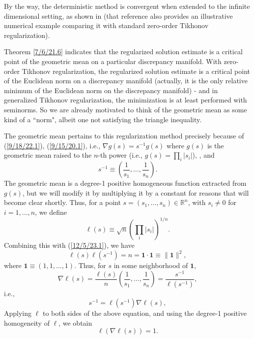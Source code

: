 \documentclass{amsart}
\numberwithin{equation}{section}
\theoremstyle{definition}
\numberwithin{theorem}{section}
\begin{document}
 By the way, the deterministic method is convergent when extended to the infinite dimensional setting, as shown in \cite{fgreensite:2022d} (that reference also provides an illustrative numerical example comparing it with standard zero-order Tikhonov regularization). 
 
 \bigskip
 
Theorem \ref{7/6/21.6} indicates that the regularized solution estimate is a critical point of the geometric mean on a particular discrepancy manifold.  With zero-order Tikhonov regularization, the regularized solution estimate is a critical point of the Euclidean norm on a discrepancy manifold (actually, it is the only relative minimum of the Euclidean norm on the discrepancy manifold) - and in generalized Tikhonov regularization, the minimization is at least performed with seminorms.  So we are already motivated to think of the geometric mean as some kind of a ``norm", albeit one not satisfying the triangle inequality. 

The geometric mean pertains to this regularization method precisely because of (\ref{9/18/22.1}), (\ref{9/15/20.1}), i.e., $\nabla g(s) = s^{-1}g(s)$ where $g(s)$ is the geometric mean raised to the $n$-th power (i.e., $g(s) = \prod_i |s_i|$), , and \begin{equation}\label{12/5/23.1} s^{-1}\equiv\left(\frac{1}{s_1},\dots, \frac{1}{s_n}\right).\end{equation} 
The geometric mean is a degree-1 positive homogeneous function extracted from $g(s) $, but we will modify it by multiplying it by a constant for reasons that will become clear shortly.   Thus, for a point $s = (s_1, \dots, s_n)\in \mathbb{R}^n$, with $s_i\ne 0$ for $i=1,\dots,n$, we define  \begin{equation}\label{12/6/23.3} \ell(s)\equiv\sqrt{n}\left(\prod_i |s_i|\right)^{1/n}.\end{equation}   Combining this with (\ref{12/5/23.1}), we have \begin{equation}\label{12/6/23.1}\ell(s)\ell(s^{-1}) = n = \mathbf{1}\cdot\mathbf{1}\equiv \|\mathbf{1}\|^2,\end{equation} where $\mathbf{1}\equiv (1,1,\dots,1)$.  Thus, for $s$ in some neighborhood of $\mathbf{1}$,
\[ \nabla \ell(s) = \frac{\ell(s)}{n}\left(\frac{1}{s_1},\dots,\frac{1}{s_n}\right) = \frac{s^{-1}}{\ell(s^{-1})},  \] i.e.,  \begin{equation}\label{12/5/23.2} s^{-1} = \ell(s^{-1})\nabla\ell(s),\end{equation}  Applying $\ell$ to both sides of the above equation, and using the degree-1 positive homogeneity of $\ell$,  we obtain \begin{equation}\label{12/6/23.5} \ell(\nabla\ell(s))
= 1.\end{equation}
\end{document}

